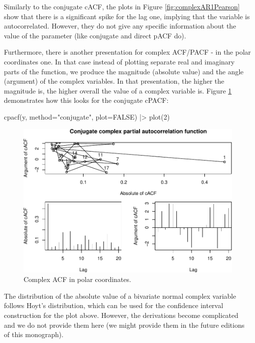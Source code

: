 \documentclass[
]{book}
\newenvironment{Shaded}{\begin{snugshade}}{\end{snugshade}}
\newcommand{\AttributeTok}[1]{\textcolor[rgb]{0.77,0.63,0.00}{#1}}
\newcommand{\ConstantTok}[1]{\textcolor[rgb]{0.00,0.00,0.00}{#1}}
\newcommand{\DecValTok}[1]{\textcolor[rgb]{0.00,0.00,0.81}{#1}}
\newcommand{\FunctionTok}[1]{\textcolor[rgb]{0.00,0.00,0.00}{#1}}
\newcommand{\NormalTok}[1]{#1}
\newcommand{\SpecialCharTok}[1]{\textcolor[rgb]{0.00,0.00,0.00}{#1}}
\newcommand{\StringTok}[1]{\textcolor[rgb]{0.31,0.60,0.02}{#1}}
\begin{document}
Similarly to the conjugate cACF, the plots in Figure \ref{fig:complexAR1Pearson} show that there is a significant spike for the lag one, implying that the variable is autocorrelated. However, they do not give any specific information about the value of the parameter (like conjugate and direct pACF do).

Furthermore, there is another presentation for complex ACF/PACF - in the polar coordinates one. In that case instead of plotting separate real and imaginary parts of the function, we produce the magnitude (absolute value) and the angle (argument) of the complex variables. In that presentation, the higher the magnitude is, the higher overall the value of a complex variable is. Figure \ref{fig:complexAR1Ploar} demonstrates how this looks for the conjugate cPACF:

\begin{Shaded}
\begin{Highlighting}[]
\FunctionTok{cpacf}\NormalTok{(y, }\AttributeTok{method=}\StringTok{"conjugate"}\NormalTok{, }\AttributeTok{plot=}\ConstantTok{FALSE}\NormalTok{) }\SpecialCharTok{|\textgreater{}}
    \FunctionTok{plot}\NormalTok{(}\DecValTok{2}\NormalTok{)}
\end{Highlighting}
\end{Shaded}

\begin{figure}
\centering
\includegraphics{Svetunkov---Svetunkov---Complex-Valued-Econometrics_files/figure-latex/complexAR1Ploar-1.pdf}
\caption{\label{fig:complexAR1Ploar}Complex ACF in polar coordinates.}
\end{figure}

The distribution of the absolute value of a bivariate normal complex variable follows Hoyt's distribution, which can be used for the confidence interval construction for the plot above. However, the derivations become complicated and we do not provide them here (we might provide them in the future editions of this monograph).
\end{document}
